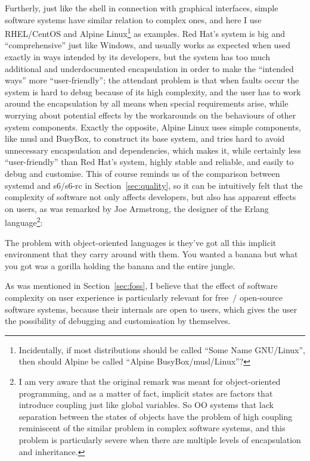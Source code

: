 Furtherly, just like the shell in connection with graphical interfaces,
simple software systems have similar relation to complex ones, and here I
use RHEL/CentOS and Alpine Linux\footnote{Incidentally, if most distributions
should be called ``Some Name GNU/Linux'', then
should Alpine be called ``Alpine BusyBox/musl/Linux''?} as examples.  Red Hat's
system is big and ``comprehensive'' just like Windows, and usually works as
expected when used exactly in ways intended by its developers, but the system
has too much additional and underdocumented encapsulation in order to make the
``intended ways'' more ``user-friendly''; the attendant problem is that when
faults occur the system is hard to debug because of its high complexity, and the
user has to work around the encapsulation by all means when special requirements
arise, while worrying about potential effects by the workarounds on the
behaviours of other system components.  Exactly the
opposite, Alpine Linux uses simple components, like musl and BusyBox, to
construct its base system, and tries hard to avoid unnecessary encapsulation
and dependencies, which makes it, while certainly less ``user-friendly'' than
Red Hat's system, highly stable and reliable, and easily to debug and customise.
This of course reminds us of the comparison between systemd and s6/s6-rc in
Section~\ref{sec:quality}, so it can be intuitively felt that the complexity of
software not only affects developers, but also has apparent effects on users,
as was remarked by Joe Armstrong, the designer of the Erlang language\footnote%
{I am very aware that the original remark was meant for object-oriented
programming, and as a matter of fact, implicit states are factors that
introduce coupling just like global variables.  So OO systems that lack
separation between the states of objects have the problem of high
coupling reminiscent of the similar problem in complex software
systems, and this problem is particularly severe when there
are multiple levels of encapsulation and inheritance.}:
\begin{quoting}
	The problem with object-oriented languages is they've got all this implicit
	environment that they carry around with them.  You wanted a banana but
	what you got was a gorilla holding the banana and the entire jungle.
\end{quoting}
As was mentioned in Section~\ref{sec:foss}, I believe that the effect
of software complexity on user experience is particularly relevant
for free~/ open-source software systems, because their internals
are open to users, which gives the user the possibility
of debugging and customisation by themselves.

